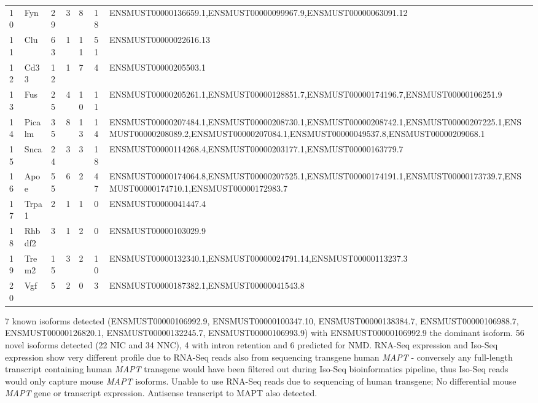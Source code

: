 \begin{landscape}
\begin{table}[]
\begin{tabular}{@{}lllllll@{}}
			10 & Fyn & 29 & 3 & 8 & 18 & ENSMUST00000136659.1,ENSMUST00000099967.9,ENSMUST00000063091.12 \\
			11 & Clu & 63 & 1 & 11 & 51 & ENSMUST00000022616.13 \\
			12 & Cd33 & 12 & 1 & 7 & 4 & ENSMUST00000205503.1 \\
			13 & Fus & 25 & 4 & 10 & 11 & ENSMUST00000205261.1,ENSMUST00000128851.7,ENSMUST00000174196.7,ENSMUST00000106251.9 \\
			14 & Picalm & 35 & 8 & 13 & 14 & ENSMUST00000207484.1,ENSMUST00000208730.1,ENSMUST00000208742.1,ENSMUST00000207225.1,ENSMUST00000208089.2,ENSMUST00000207084.1,ENSMUST00000049537.8,ENSMUST00000209068.1 \\
			15 & Snca & 24 & 3 & 3 & 18 & ENSMUST00000114268.4,ENSMUST00000203177.1,ENSMUST00000163779.7 \\
			16 & Apoe & 55 & 6 & 2 & 47 & ENSMUST00000174064.8,ENSMUST00000207525.1,ENSMUST00000174191.1,ENSMUST00000173739.7,ENSMUST00000174710.1,ENSMUST00000172983.7 \\
			17 & Trpa1 & 2 & 1 & 1 & 0 & ENSMUST00000041447.4 \\
			18 & Rhbdf2 & 3 & 1 & 2 & 0 & ENSMUST00000103029.9 \\
			19 & Trem2 & 15 & 3 & 2 & 10 & ENSMUST00000132340.1,ENSMUST00000024791.14,ENSMUST00000113237.3 \\
			20 & Vgf & 5 & 2 & 0 & 3 & ENSMUST00000187382.1,ENSMUST00000041543.8 \\ \bottomrule
		\end{tabular}
	\end{table}
\end{landscape}

7 known isoforms detected (ENSMUST00000106992.9, ENSMUST00000100347.10, ENSMUST00000138384.7, ENSMUST00000106988.7, ENSMUST00000126820.1, ENSMUST00000132245.7, ENSMUST00000106993.9) with ENSMUST00000106992.9 the dominant isoform. 
56 novel isoforms detected (22 NIC and 34 NNC), 4 with intron retention and 6 predicted for NMD.  
RNA-Seq expression and Iso-Seq expression show very different profile due to RNA-Seq reads also from sequencing transgene human \textit{MAPT} - conversely any full-length transcript containing human \textit{MAPT} transgene would have been filtered out during Iso-Seq bioinformatics pipeline, thus Iso-Seq reads would only capture mouse \textit{MAPT} isoforms. Unable to use RNA-Seq reads due to sequencing of human transgene; No differential mouse \textit{MAPT} gene or transcript expression. 
Antisense transcript to MAPT also detected.


